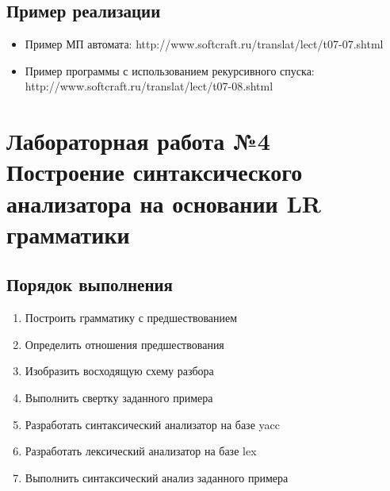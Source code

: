 \documentclass[a4paper,12pt]{article}
\begin{document}
\subsection{Пример реализации}
\begin{itemize}
	\item Пример МП автомата: http://www.softcraft.ru/translat/lect/t07-07.shtml
	\item Пример программы с использованием рекурсивного спуска: http://www.softcraft.ru/translat/lect/t07-08.shtml
\end{itemize}

\newpage
\section{Лабораторная работа №4\\
	Построение синтаксического анализатора на основании LR грамматики}

\subsection{Порядок выполнения}
\begin{enumerate}
	\item Построить грамматику с предшествованием
	\item Определить отношения предшествования
	\item Изобразить восходящую схему разбора
	\item Выполнить свертку заданного примера
	\item Разработать синтаксический анализатор на базе yacc
	\item Разработать лексический анализатор на базе lex
	\item Выполнить синтаксический анализ заданного примера
\end{enumerate}
\end{document}
